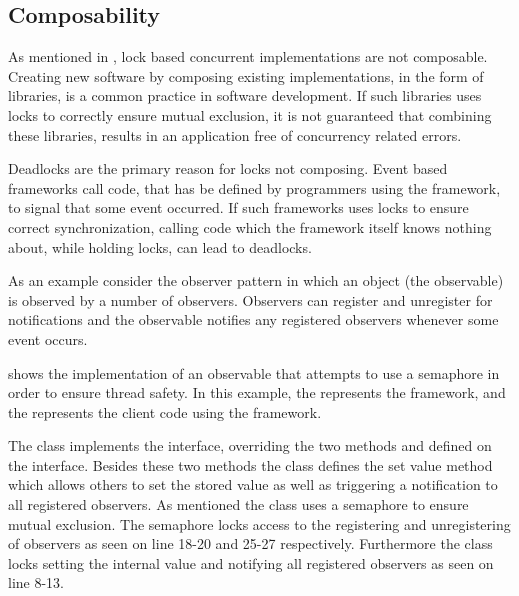 
\subsection{Composability}\label{subsec:tl_composability}
As mentioned in , lock based concurrent implementations are not composable. Creating new software by composing existing implementations, in the form of libraries, is a common practice in software development. If such libraries uses locks to correctly ensure mutual exclusion, it is not guaranteed that combining these libraries, results in an application free of concurrency related errors.

Deadlocks are the primary reason for locks not composing\cite[p. 58]{sutter2005software}. Event based frameworks call code, that has be defined by programmers using the framework, to signal that some event occurred. If such frameworks uses locks to ensure correct synchronization, calling code which the framework itself knows nothing about, while holding locks, can lead to deadlocks.

As an example consider the observer pattern\cite{gamma1994design} in which an object (the observable) is observed by a number of observers. Observers can register and unregister for notifications and the observable notifies any registered observers whenever some event occurs. 

 shows the implementation of an observable that attempts to use a semaphore in order to ensure thread safety. In this example, the  represents the framework, and the  represents the client code using the framework. 

The  class implements the  interface, overriding the two methods  and  defined on the interface. Besides these two methods the   class defines the set value method which allows others to set the stored value as well as triggering a notification to all registered observers. As mentioned the  class uses a semaphore to ensure mutual exclusion. The semaphore locks access to the registering and unregistering of observers as seen on line 18-20 and 25-27 respectively. Furthermore the  class locks setting the internal value and notifying all registered observers as seen on line 8-13.

